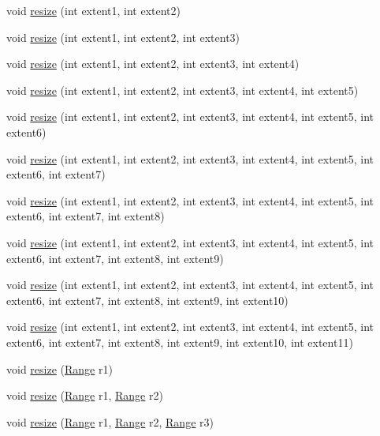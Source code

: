 \begin{DoxyCompactItemize}
\item 
void \hyperlink{classArray_a87b0a62ead0e9f5b9301c136f84cd905}{resize} (int extent1, int extent2)
\item 
void \hyperlink{classArray_ad9645f153b9cb813a48921218ab98d56}{resize} (int extent1, int extent2, int extent3)
\item 
void \hyperlink{classArray_a9064c917ba0bbfe654fbc5f15cd4f10d}{resize} (int extent1, int extent2, int extent3, int extent4)
\item 
void \hyperlink{classArray_ad5f4f5d5dd60695d44fa7fd89dcae1f6}{resize} (int extent1, int extent2, int extent3, int extent4, int extent5)
\item 
void \hyperlink{classArray_a75b45780cf8fa23529efe8919267d64c}{resize} (int extent1, int extent2, int extent3, int extent4, int extent5, int extent6)
\item 
void \hyperlink{classArray_ae73a1aba093cb7b2b1e55c93a6cd6e16}{resize} (int extent1, int extent2, int extent3, int extent4, int extent5, int extent6, int extent7)
\item 
void \hyperlink{classArray_a10a80555b4803195f5a3af36e8eb67c2}{resize} (int extent1, int extent2, int extent3, int extent4, int extent5, int extent6, int extent7, int extent8)
\item 
void \hyperlink{classArray_ae84f84322b8a5c6548a1e5129749bd59}{resize} (int extent1, int extent2, int extent3, int extent4, int extent5, int extent6, int extent7, int extent8, int extent9)
\item 
void \hyperlink{classArray_a7e131cc801b01b56151e470a9efa1f32}{resize} (int extent1, int extent2, int extent3, int extent4, int extent5, int extent6, int extent7, int extent8, int extent9, int extent10)
\item 
void \hyperlink{classArray_aa61eabd09786a151e4da0852105bd0d0}{resize} (int extent1, int extent2, int extent3, int extent4, int extent5, int extent6, int extent7, int extent8, int extent9, int extent10, int extent11)
\item 
void \hyperlink{classArray_a4522b1267ad81224a7290c6ba2d995ec}{resize} (\hyperlink{classRange}{Range} r1)
\item 
void \hyperlink{classArray_a1c139020b6659b6ed5ae94ce54a11168}{resize} (\hyperlink{classRange}{Range} r1, \hyperlink{classRange}{Range} r2)
\item 
void \hyperlink{classArray_ade35a5046e18b7214e8a20c7537e278e}{resize} (\hyperlink{classRange}{Range} r1, \hyperlink{classRange}{Range} r2, \hyperlink{classRange}{Range} r3)
\item 

\end{DoxyCompactItemize}

